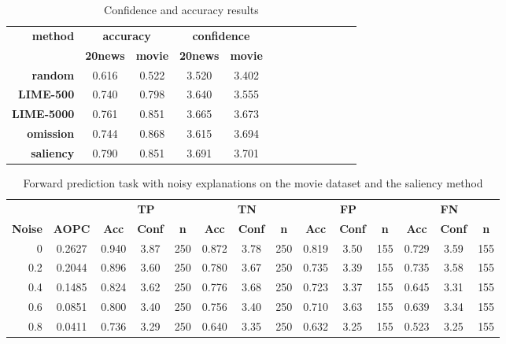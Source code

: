 \documentclass[11pt,a4paper]{article}
\begin{document}
\begin{table}
 \small
\begin{tabular}{rcccccccccccc}
\toprule 
 \textbf{method}  & \multicolumn{2}{c}{\textbf{accuracy}}& \multicolumn{2}{c}{\textbf{confidence}}\\
& \textbf{20news} & \textbf{movie}& \textbf{20news} & \textbf{movie}\\
\midrule 
\textbf{random}    &  0.616 & 0.522 &    3.520           &       3.402\\
\textbf{LIME-500}  & 0.740 &  0.798    &       3.640     &   3.555\\
\textbf{LIME-5000}  & 0.761 &  0.851  &     3.665       &  3.673\\
\textbf{omission}  & 0.744 &  0.868 &   3.615          &   3.694\\
\textbf{saliency}   & 0.790 &  0.851 &   3.691 		& 3.701\\
\bottomrule 
\end{tabular} 
 \caption{Confidence and accuracy results}
\label{stats:confidence_method}
\end{table}

\begin{table*}[t!]
\center
\small
\begin{tabular}{rc|ccc|ccc|ccc|ccc}
\toprule 
   &  &\multicolumn{3}{c}{\textbf{TP}} &  \multicolumn{3}{c}{\textbf{TN}} &  \multicolumn{3}{c}{\textbf{FP}} &  \multicolumn{3}{c}{\textbf{FN}} \\ 
 \textbf{Noise} &\textbf{AOPC} & \textbf{Acc} & \textbf{Conf} & \textbf{n} &  \textbf{Acc} & \textbf{Conf} & \textbf{n} &   \textbf{Acc} & \textbf{Conf} & \textbf{n}&   \textbf{Acc} & \textbf{Conf} & \textbf{n}\\ 

\midrule 
0& 0.2627&
0.940 & 3.87 & 250 & 0.872 & 3.78 & 250 & 0.819 & 3.50 & 155 & 0.729 & 3.59 & 155 \\
0.2 & 0.2044 &0.896 & 3.60 & 250 & 0.780 & 3.67 & 250 & 0.735 & 3.39 & 155 & 0.735 & 3.58 & 155 \\
0.4& 0.1485 &0.824 & 3.62 & 250 & 0.776 & 3.68 & 250 & 0.723 & 3.37 & 155 & 0.645 & 3.31 & 155  \\
0.6& 0.0851&0.800 & 3.40 & 250 & 0.756 & 3.40 & 250 & 0.710 & 3.63 & 155 & 0.639 & 3.34 & 155  \\
0.8& 0.0411&0.736 & 3.29 & 250 & 0.640 & 3.35 & 250 & 0.632 & 3.25 & 155 & 0.523 & 3.25 & 155  \\
\bottomrule 
\end{tabular} 
\caption{Forward prediction task with noisy explanations on the movie dataset and the saliency method}
\label{results:forward_noise}
\end{table*}
\end{document}
